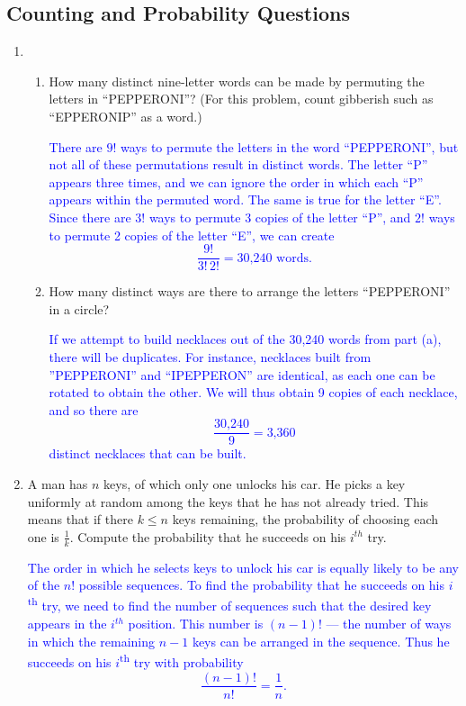 \documentclass{article}    %
\newcommand{\grade}[1]{\textcolor{red}{#1}}
\renewcommand{\grade}[1]{ }	%
\begin{document}
\subsection*{Counting and Probability Questions}\grade{44 points.}
\begin{enumerate}
\item 
\begin{enumerate}
\item How many distinct nine-letter words can be made by permuting the letters in ``PEPPERONI''? (For this problem, count gibberish such as ``EPPERONIP'' as a word.)

\medskip

\textcolor{blue}{There are $9!$ ways to permute the letters in the word ``PEPPERONI'', but not all of these permutations result in distinct words. The letter ``P'' appears three times, and we can ignore the order in which each ``P'' appears within the permuted word. The same is true for the letter ``E''. Since there are $3!$ ways to permute 3 copies of the letter ``P'', and $2!$ ways to permute 2 copies of the letter ``E'', we can create $$ \frac{9!}{3!\, 2!} = \text{30,240 words}.$$}

\item How many distinct ways are there to arrange the letters ``PEPPERONI'' in a circle?

\medskip

\textcolor{blue}{        If we attempt to build necklaces out of the 30,240 words from part (a), there will be duplicates. For instance, necklaces built from ''PEPPERONI'' and ``IPEPPERON'' are identical, as each one can be rotated to obtain the other. We will thus obtain 9 copies of each necklace, and so there are
        $$
            \frac{\text{30,240}}{9} = \text{3,360}
        $$
        distinct necklaces that can be built.} 
\end{enumerate}
\item A man has $n$ keys, of which only one unlocks his car.  He picks a key uniformly at random among the keys that he has not already tried.  This means that if there $k \leq n$ keys remaining, the probability of choosing each one is $\frac{1}{k}$.  Compute the probability that he succeeds on his $i^{th}$ try.

\medskip

\textcolor{blue}{The order in which he selects keys to unlock his car is equally likely to be any of the $n!$ possible sequences. To find the probability that he succeeds on his $i$\textsuperscript{th} try, we need to find the number of sequences such that the desired key appears in the $i^{th}$ position. This number is $(n-1)!$ --- the number of ways in which the remaining $n-1$ keys can be arranged in the sequence. Thus he succeeds on his $i$\textsuperscript{th} try with probability
    $$
        \frac{(n-1)!}{n!} = \frac{1}{n}.
    $$}


\end{enumerate}
\end{document}
